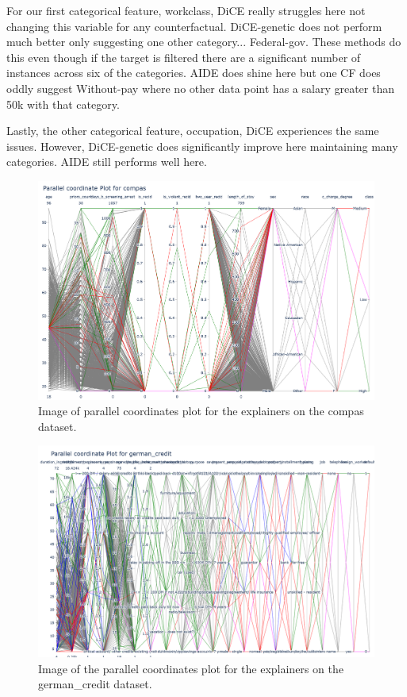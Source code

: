 For our first categorical feature, workclass, DiCE really struggles here not changing this variable for any counterfactual. DiCE-genetic does not perform much better only suggesting one other category... Federal-gov. These methods do this even though if the target is filtered there are a significant number of instances across six of the categories. AIDE does shine here but one CF does oddly suggest Without-pay where no other data point has a salary greater than 50k with that category.

Lastly, the other categorical feature, occupation, DiCE experiences the same issues. However, DiCE-genetic does significantly improve here maintaining many categories. AIDE still performs well here.

\begin{figure}[!htbp]
    \centering
    \includegraphics[width=\textwidth]{images/pcp-compas.png}
    \caption{Image of parallel coordinates plot for the explainers on the compas dataset.}
    \label{fig:pcp-compas}
\end{figure}
\begin{figure}[!htbp]
    \centering
    \includegraphics[width=\textwidth]{images/pcp-german_credit.png}
    \caption{Image of the parallel coordinates plot for the explainers on the german\_credit dataset.}
    \label{fig:pcp-german_credit}
\end{figure}
